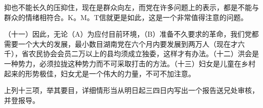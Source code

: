 抑也不能长久的压抑住，现在是群众向左，而党在许多问题上的表示，都是不能与群众的情绪相符合。K。M。T信就更是如此，这是一个非常值得注意的问题。

（十一）因此，无论（A）为应付目前环境，（B）准备不久要求的革命，我们党都需要一个大大的发展，最小数目湖南党在六个月内要发展到两万人（现在才六千），省农民协会会员二万以上的县均须成立独委，这样才有办法。（十二）洪会是一种势力，必须拉拢这种势力而不可采取打击的方法。（十三）妇女是儿童在乡村起来的形势极佳，妇女尤是一个伟大的力量，不可不加注意。

上列十三项，举其要目，详细情形当从明日起三四日内写出一个报告送兄处审核，并登报导。

